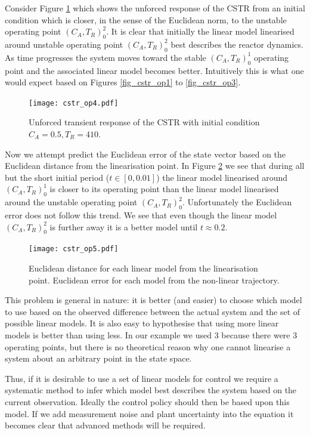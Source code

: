 \documentclass[../masters.tex]{subfiles}
\begin{document}
Consider Figure \ref{fig_cstr_op4} which shows the unforced response of the CSTR from an initial condition which is closer, in the sense of the Euclidean norm, to the unstable operating point $(C_A, T_R)_0^2$. It is clear that initially the linear model linearised around unstable operating point $(C_A, T_R)_0^2$ best describes the reactor dynamics. As time progresses the system moves toward the stable $(C_A, T_R)_0^1$ operating point and the associated linear model becomes better. Intuitively this is what one would expect based on Figures \ref{fig_cstr_op1} to \ref{fig_cstr_op3}.
\begin{figure}[H] 
\centering
\texttt{[image: cstr\_op4.pdf]}
\caption{Unforced transient response of the CSTR with initial condition $C_A = 0.5,T_R=410$.}
\label{fig_cstr_op4}
\end{figure}
Now we attempt predict the Euclidean error of the state vector based on the Euclidean distance from the linearisation point. In Figure \ref{fig_cstr_op5} we see that during all but the short initial period ($t \in [0, 0.01]$) the linear model linearised around $(C_A, T_R)_0^1$ is closer to its operating point than the linear model linearised around the unstable operating point $(C_A, T_R)_0^2$. Unfortunately the Euclidean error does not follow this trend. We see that even though the linear model $(C_A, T_R)_0^2$ is further away it is a better model until $t \approx 0.2$.  
\begin{figure}[H] 
\centering
\texttt{[image: cstr\_op5.pdf]}
\caption{Euclidean distance for each linear model from the linearisation point. Euclidean error for each model from the non-linear trajectory.}
\label{fig_cstr_op5}
\end{figure}
This problem is general in nature: it is better (and easier) to choose which model to use based on the observed difference between the actual system and the set of possible linear models. It is also easy to hypothesise that using more linear models is better than using less. In our example we used 3 because there were 3 operating points, but there is no theoretical reason why one cannot linearise a system about an arbitrary point in the state space.

Thus, if it is desirable to use a set of linear models for control we require a systematic method to infer which model best describes the system based on the current observation. Ideally the control policy should then be based upon this model. If we add measurement noise and plant uncertainty into the equation it becomes clear that advanced methods will be required. 



\end{document}

